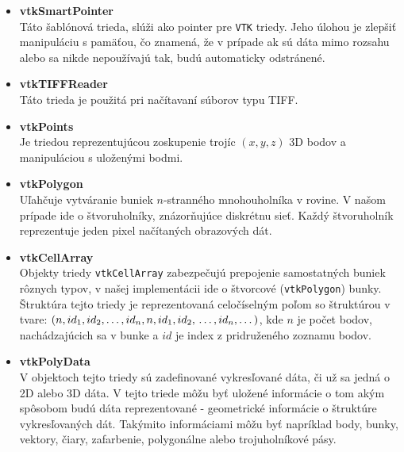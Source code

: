\documentclass[a4paper,11pt,oneside]{article}%
\begin{document}
\begin{itemize}
\item \textbf{vtkSmartPointer} \\
Táto šablónová trieda, slúži ako pointer pre \texttt{VTK} triedy. Jeho úlohou je zlepšiť manipuláciu s pamäťou, čo znamená, že v prípade ak sú dáta mimo rozsahu alebo sa nikde nepoužívajú tak, budú automaticky odstránené. %

\item \textbf{vtkTIFFReader} \\
Táto trieda je použitá pri načítavaní súborov typu TIFF.

\item \textbf{vtkPoints} \\
Je triedou reprezentujúcou zoskupenie trojíc $(x, y, z)$ 3D bodov a manipuláciou s uloženými bodmi.
 
\item \textbf{vtkPolygon} \\
Uľahčuje vytváranie buniek $n$-stranného mnohouholníka v rovine. V našom prípade ide o štvoruholníky, znázorňujúce diskrétnu sieť. Každý štvoruholník reprezentuje jeden pixel načítaných obrazových dát.     
 

\item \textbf{vtkCellArray} \\
Objekty triedy \texttt{vtkCellArray} zabezpečujú prepojenie samostatných buniek rôznych typov, v našej implementácii ide o štvorcové (\texttt{vtkPolygon}) bunky. Štruktúra tejto triedy je reprezentovaná celočíselným poľom so štruktúrou v tvare: $(n,id_1,id_2, \dots,id_n, n,id_1,id_2, \\ \dots,id_n, \dots)$, kde $n$ je počet bodov, nachádzajúcich sa v bunke a $id$ je index z pridruženého zoznamu bodov.

\item \textbf{vtkPolyData} \\
V objektoch tejto triedy sú zadefinované vykresľované dáta, či už sa jedná o 2D alebo 3D dáta. V tejto triede môžu byť uložené informácie o tom akým spôsobom budú dáta reprezentované - geometrické informácie o štruktúre vykresľovaných dát. Takýmito informáciami môžu byť napríklad body, bunky, vektory, čiary, zafarbenie, polygonálne alebo trojuholníkové pásy.


\end{itemize}
\end{document}
